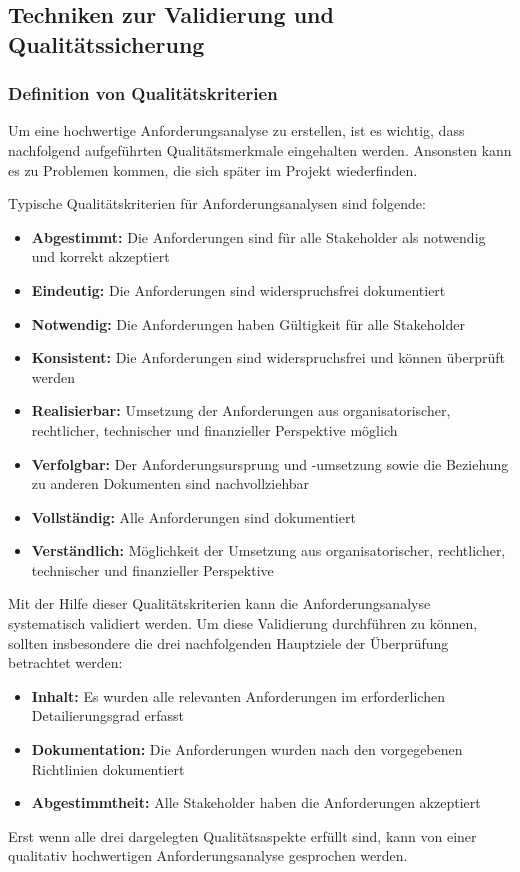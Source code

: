 
\subsection{Techniken zur Validierung und Qualitätssicherung}
\subsubsection{Definition von Qualitätskriterien}
Um eine hochwertige Anforderungsanalyse zu erstellen, ist es wichtig, dass nachfolgend aufgeführten Qualitätsmerkmale eingehalten werden.
Ansonsten kann es zu Problemen kommen, die sich später im Projekt wiederfinden.

Typische Qualitätskriterien für Anforderungsanalysen sind folgende:
\begin{itemize}
    \item \textbf{Abgestimmt:} Die Anforderungen sind für alle Stakeholder als notwendig und korrekt akzeptiert
    \item \textbf{Eindeutig:} Die Anforderungen sind widerspruchsfrei dokumentiert
    \item \textbf{Notwendig:} Die Anforderungen haben Gültigkeit für alle Stakeholder
    \item \textbf{Konsistent:} Die Anforderungen sind widerspruchsfrei und können überprüft werden
    \item \textbf{Realisierbar:} Umsetzung der Anforderungen aus organisatorischer, rechtlicher, technischer und finanzieller Perspektive möglich
    \item \textbf{Verfolgbar:} Der Anforderungsursprung und -umsetzung sowie die Beziehung zu anderen Dokumenten sind nachvollziehbar
    \item \textbf{Vollständig:} Alle Anforderungen sind dokumentiert
    \item \textbf{Verständlich:} Möglichkeit der Umsetzung aus organisatorischer, rechtlicher, technischer und finanzieller Perspektive
\end{itemize}\autocite[vgl.][Seite 44]{Maulhardt.b}

Mit der Hilfe dieser Qualitätskriterien kann die Anforderungsanalyse systematisch validiert werden.
Um diese Validierung durchführen zu können, sollten insbesondere die drei nachfolgenden Hauptziele der Überprüfung betrachtet werden:
\begin{itemize}
    \item \textbf{Inhalt:} Es wurden alle relevanten Anforderungen im erforderlichen Detailierungsgrad erfasst
    \item \textbf{Dokumentation:} Die Anforderungen wurden nach den vorgegebenen Richtlinien dokumentiert
    \item \textbf{Abgestimmtheit:} Alle Stakeholder haben die Anforderungen akzeptiert
\end{itemize}
Erst wenn alle drei dargelegten Qualitätsaspekte erfüllt sind, kann von einer qualitativ hochwertigen Anforderungsanalyse gesprochen werden\autocite[vgl.][Seite 16ff]{Maulhardt.c}.

